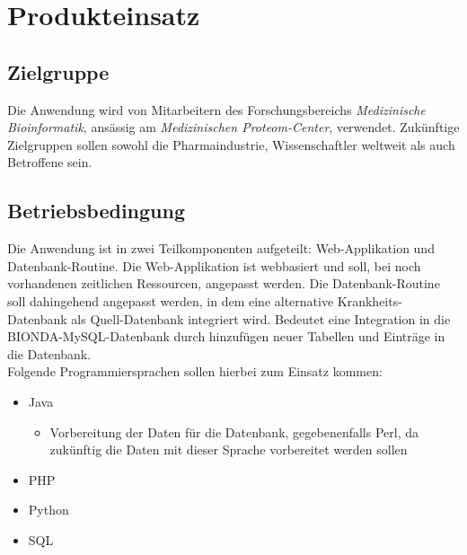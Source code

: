 \chapter*{Produkteinsatz}

\section*{Zielgruppe}
Die Anwendung wird von Mitarbeitern des Forschungsbereichs \textit{Medizinische Bioinformatik}, ansässig am \textit{Medizinischen Proteom-Center},  verwendet. Zukünftige Zielgruppen sollen sowohl die Pharmaindustrie, Wissenschaftler weltweit als auch Betroffene sein.

\section*{Betriebsbedingung}
Die Anwendung ist in zwei Teilkomponenten aufgeteilt: Web-Applikation und Datenbank-Routine. Die Web-Applikation ist webbasiert und soll, bei noch vorhandenen zeitlichen Ressourcen, angepasst werden. Die Datenbank-Routine soll dahingehend angepasst werden, in dem eine alternative Krankheits-Datenbank als Quell-Datenbank integriert wird. Bedeutet eine Integration in die BIONDA-MySQL-Datenbank durch hinzufügen neuer Tabellen und Einträge in die Datenbank.\\

Folgende Programmiersprachen sollen hierbei zum Einsatz kommen:
\begin{itemize}
\item{Java}
\begin{itemize}
\item{Vorbereitung der Daten für die Datenbank, gegebenenfalls Perl, da zukünftig die Daten mit dieser Sprache vorbereitet werden sollen}
\end{itemize}
\item{PHP}
\item{Python}
\item{SQL}
\end{itemize}
